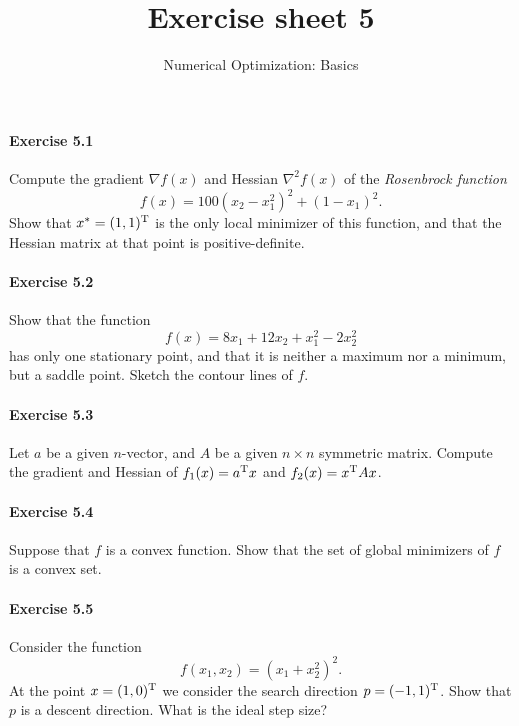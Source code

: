 
\title{Exercise sheet 5}
\subtitle{Numerical Optimization: Basics}
\newcommand\tp{\ensuremath{\text{\upshape T}}}

\maketitle

\paragraph{Exercise 5.1} %
Compute  the gradient $\nabla f(x)$ and Hessian $\nabla^2f(x)$ of the
\emph{Rosenbrock function}
\begin{equation}\label{eq:rosenbrock}
  f(x) = 100(x_2-x_1^2)^2 + (1-x_1)^2.
\end{equation}
Show that $x^*=(1,1)^\tp$ is the only local minimizer of this function, and
that the Hessian matrix at that point is positive-definite.

\paragraph{Exercise 5.2} %
Show that the function
\[
  f(x) = 8x_1 + 12x_2 + x_1^2 - 2x_2^2
\]
has only one stationary point, and that it is neither a maximum nor a minimum,
but a saddle point. Sketch the contour lines of $f$.

\paragraph{Exercise 5.3} %
Let $a$ be a given $n$-vector, and $A$ be a given $n\times n$ symmetric matrix. Compute the
gradient and Hessian of $f_1(x) = a^\tp x$ and $f_2 (x) =x^\tp Ax$.


\paragraph{Exercise 5.4} %
Suppose that $f$ is a convex function. Show that the set of global minimizers
of $f$ is a convex set.

\paragraph{Exercise 5.5} %
Consider the function
\[
  f(x_1, x_2) = (x_1+x_2^2)^2.
\]
At the point $x=(1,0)^\tp$ we consider the search direction $p=(-1,1)^\tp$.
Show that $p$ is a descent direction. What is the ideal step size?

